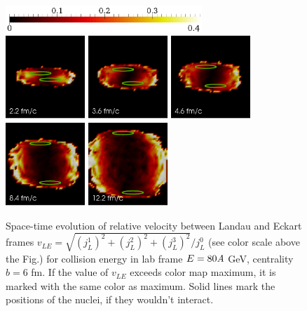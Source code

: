 \begin{figure}
  \includegraphics[height = 1cm]{plots/thermalization_urqmd/E80b6_x_paraview_color_legend.png} \\
  \includegraphics[width = 3.0cm]{plots/thermalization_urqmd/E80b6_vLE_paraview_t2_2fm.png}
  \includegraphics[width = 3.0cm]{plots/thermalization_urqmd/E80b6_vLE_paraview_t3_6fm.png}
  \includegraphics[width = 3.0cm]{plots/thermalization_urqmd/E80b6_vLE_paraview_t4_6fm.png}
  \includegraphics[width = 3.0cm]{plots/thermalization_urqmd/E80b6_vLE_paraview_t8_4fm.png}
  \includegraphics[width = 3.0cm]{plots/thermalization_urqmd/E80b6_vLE_paraview_t12_2fm.png}
  \caption{Space-time evolution of relative velocity between Landau and Eckart
           frames $v_{LE} = \sqrt{(j_L^1)^2 + (j_L^2)^2 + (j_L^3)^2}/j_L^0$ (see color
           scale above the Fig.) for collision energy in lab frame $E = 80\emph{A}$
           GeV, centrality $b = 6$ fm. If the value of $v_{LE}$ exceeds color map
           maximum, it is marked with the same color as maximum. Solid lines mark the
           positions of the nuclei, if they wouldn't interact.}
  \label{FIG:vLE_paraview_space_time_evolution}
\end{figure}

